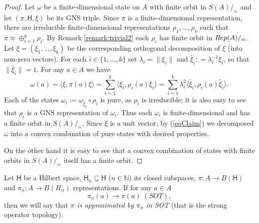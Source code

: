 \documentclass[11 pt, leqno, hidelinks]{amsart}%
\theoremstyle{plain}
\numberwithin{equation}{section}
\newcommand{\Rep}{\textup{Rep}}
\newcommand{\Hil}{\mathsf{H}}
\begin{document}
\begin{proof}  Let $\omega$ be a finite-dimensional state on $A$ with finite orbit in $S(A)/_\approx$ and let $(\pi,\Hil, \xi)$ be its GNS triple.  Since $\pi$ is a finite-dimensional representation, there are irreducible finite-dimensional representations $\rho_1, \ldots, \rho_k$ such that
	$\pi \approx \oplus_{i=1}^k \rho_i.$ By Remark \ref{remark:trivial2} each $\rho_i$ has finite orbit in  $\Rep(A)/_\approx$. Let $\xi = (\xi_1, \ldots, \xi_k)$ be the corresponding orthogonal decomposition of $\xi$ (into non-zero vectors).  For each $i \in \{1, \ldots,k\}$ set $\lambda_i = \|\xi_i\| $ and $\widetilde{\xi_i}: = \lambda_i^{-1} \xi_i$, so that $\|\widetilde{\xi_i}\|=1$. For any $a \in A$ we have
	\begin{equation}\label{eqClaim} \omega(a)  =  \langle\xi, \pi(a)\xi\rangle = \sum_{i=1}^k \langle\xi_i, \rho_i(a)\xi_i\rangle = \sum_{i=1}^k \lambda_i^{2} \langle\widetilde{\xi_i}, \rho_i(a) \widetilde{\xi_i}\rangle.\end{equation}
	Each of the states $\omega_i:=\omega_{\widetilde{\xi_i}} \circ \rho_i$  is pure, as   $\rho_i$ is irreducible; it is also easy to see that $\rho_i$ is a GNS representation of $\omega_i$. Thus each $\omega_i$ is finite-dimensional and has a finite orbit in  $S(A)/_\approx$. %
	Since $\xi$ is a unit vector,  by (\ref{eqClaim}) we decomposed $\omega$ into a convex combination of pure states with desired properties.
	
	On the other hand it is easy to see that a convex combination of states with finite orbits in $S(A)/_\approx$ itself has a finite orbit.
\end{proof}





Let $\Hil$ be a  Hilbert space, $\Hil_n\subseteq \Hil$ ($n\in \mathbb N$)  its closed subspaces, $\pi: A \to B(\Hil)$ and $ \pi_n: A \to B(H_n)$ representations. If for any $a\in A$
$$\pi_n(a) \to \pi(a) \;(SOT),$$
then we will say that {\it $\pi$ is approximated by $\pi_n$ in SOT} (that is the strong operator topology).
\end{document}
